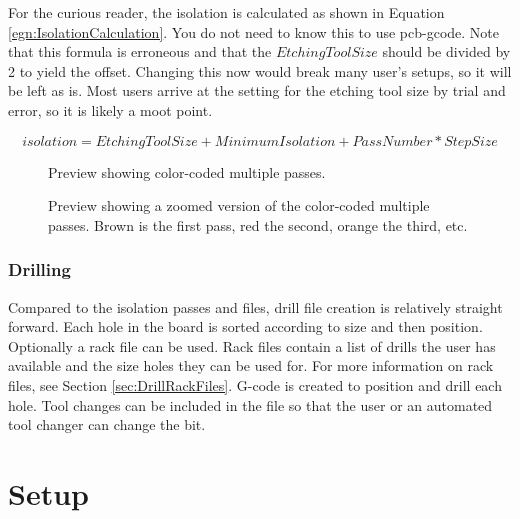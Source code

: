 \documentclass[11pt]{book}
\begin{document}
\howitworks{}
For the curious reader, the isolation is calculated as shown in Equation \vref{egn:IsolationCalculation}. You do not need to know this to use pcb-gcode. Note that this formula is erroneous and that the $EtchingToolSize$ should be divided by 2 to yield the offset. Changing this now would break many user's setups, so it will be left as is. Most users arrive at the setting for the etching tool size by trial and error, so it is likely a moot point.

\begin{equation}
isolation = EtchingToolSize+MinimumIsolation+PassNumber*StepSize
\label{egn:IsolationCalculation}
\end{equation}


\begin{figure}
	\caption{Preview showing color-coded multiple passes.}
	\label{fig:MultipassBoard}
\end{figure}

\begin{figure}
	\caption{Preview showing a zoomed version of the color-coded multiple passes. Brown is the first pass, red the second, orange the third, etc.}
	\label{fig:MultipassBoardZoom}
\end{figure}

\subsection{Drilling}
Compared to the isolation passes and files, drill file creation is relatively straight forward. Each hole in the board is sorted according to size and then position. Optionally a rack file can be used. Rack files contain a list of drills the user has available and the size holes they can be used for. For more information on rack files, see Section \vref{sec:DrillRackFiles}. G-code is created to position and drill each hole. Tool changes can be included in the file so that the user or an automated tool changer can change the bit.

%
\chapter{Setup}\label{chp:Setup}
%

%
%
\end{document}
